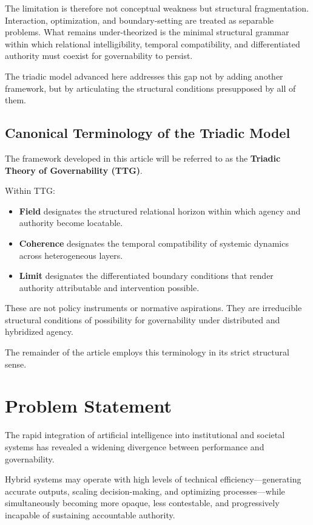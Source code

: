 \documentclass[12pt]{article}
\begin{document}
The limitation is therefore not conceptual weakness but structural fragmentation. Interaction, optimization, and boundary-setting are treated as separable problems. What remains under-theorized is the minimal structural grammar within which relational intelligibility, temporal compatibility, and differentiated authority must coexist for governability to persist.

The triadic model advanced here addresses this gap not by adding another framework, but by articulating the structural conditions presupposed by all of them.

\subsection{Canonical Terminology of the Triadic Model}


The framework developed in this article will be referred to as the \textbf{Triadic Theory of Governability (TTG)}.

Within TTG:

\begin{itemize}
\item \textbf{Field} designates the structured relational horizon within which agency and authority become locatable.
\item \textbf{Coherence} designates the temporal compatibility of systemic dynamics across heterogeneous layers.
\item \textbf{Limit} designates the differentiated boundary conditions that render authority attributable and intervention possible.
\end{itemize}

These are not policy instruments or normative aspirations. They are irreducible structural conditions of possibility for governability under distributed and hybridized agency.

The remainder of the article employs this terminology in its strict structural sense.

\section*{Problem Statement}


The rapid integration of artificial intelligence into institutional and societal systems has revealed a widening divergence between performance and governability.

Hybrid systems may operate with high levels of technical efficiency—generating accurate outputs, scaling decision-making, and optimizing processes—while simultaneously becoming more opaque, less contestable, and progressively incapable of sustaining accountable authority.
\end{document}
